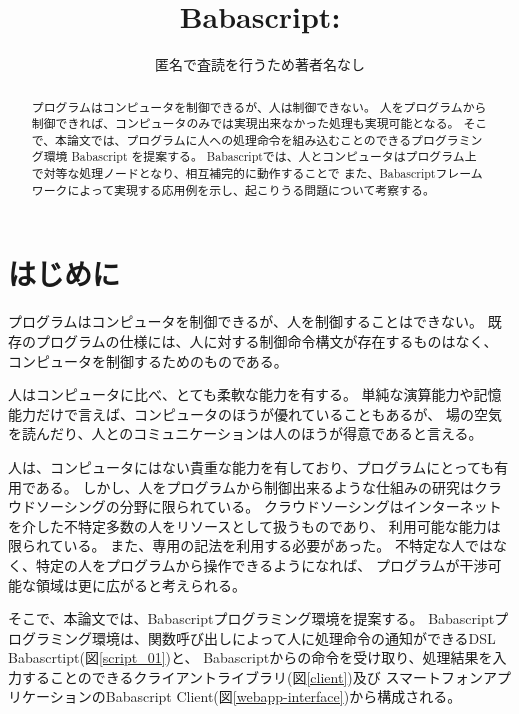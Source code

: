 \title{Babascript: }


\author{匿名で査読を行うため著者名なし
  }

\begin{abstract}

プログラムはコンピュータを制御できるが、人は制御できない。
人をプログラムから制御できれば、コンピュータのみでは実現出来なかった処理も実現可能となる。
そこで、本論文では、プログラムに人への処理命令を組み込むことのできるプログラミング環境 Babascript を提案する。
Babascriptでは、人とコンピュータはプログラム上で対等な処理ノードとなり、相互補完的に動作することで
また、Babascriptフレームワークによって実現する応用例を示し、起こりうる問題について考察する。

\end{abstract}

\maketitle

\section{はじめに}\label{ux306fux3058ux3081ux306b}

プログラムはコンピュータを制御できるが、人を制御することはできない。
既存のプログラムの仕様には、人に対する制御命令構文が存在するものはなく、
コンピュータを制御するためのものである。

人はコンピュータに比べ、とても柔軟な能力を有する。
単純な演算能力や記憶能力だけで言えば、コンピュータのほうが優れていることもあるが、
場の空気を読んだり、人とのコミュニケーションは人のほうが得意であると言える。

人は、コンピュータにはない貴重な能力を有しており、プログラムにとっても有用である。
しかし、人をプログラムから制御出来るような仕組みの研究はクラウドソーシングの分野に限られている。
クラウドソーシングはインターネットを介した不特定多数の人をリソースとして扱うものであり、
利用可能な能力は限られている。 また、専用の記法を利用する必要があった。
不特定な人ではなく、特定の人をプログラムから操作できるようになれば、
プログラムが干渉可能な領域は更に広がると考えられる。

そこで、本論文では、Babascriptプログラミング環境を提案する。
Babascriptプログラミング環境は、関数呼び出しによって人に処理命令の通知ができるDSL
Babascrtipt(図\ref{script_01})と、
Babascriptからの命令を受け取り、処理結果を入力することのできるクライアントライブラリ(図\ref{client})及び
スマートフォンアプリケーションのBabascript
Client(図\ref{webapp-interface})から構成される。

